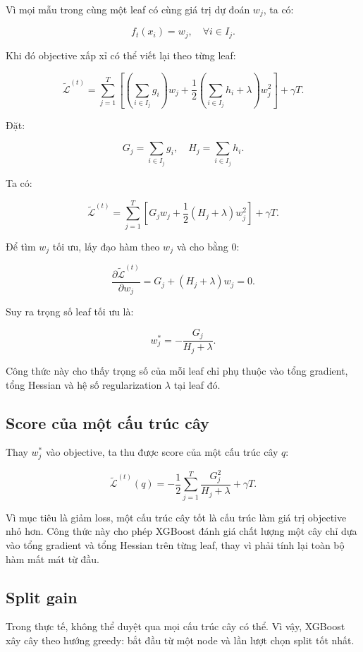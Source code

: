Vì mọi mẫu trong cùng một leaf có cùng giá trị dự đoán $w_j$, ta có:

\[
f_t(x_i) = w_j, \quad \forall i \in I_j.
\]

Khi đó objective xấp xỉ có thể viết lại theo từng leaf:

\[
\tilde{\mathcal{L}}^{(t)}
=
\sum_{j=1}^{T}
\left[
\left(\sum_{i \in I_j} g_i\right) w_j
+
\frac{1}{2}
\left(\sum_{i \in I_j} h_i + \lambda\right) w_j^2
\right]
+
\gamma T.
\]

Đặt:

\[
G_j = \sum_{i \in I_j} g_i,
\quad
H_j = \sum_{i \in I_j} h_i.
\]

Ta có:

\[
\tilde{\mathcal{L}}^{(t)}
=
\sum_{j=1}^{T}
\left[
G_j w_j
+
\frac{1}{2}(H_j + \lambda)w_j^2
\right]
+
\gamma T.
\]

Để tìm $w_j$ tối ưu, lấy đạo hàm theo $w_j$ và cho bằng 0:

\[
\frac{\partial \tilde{\mathcal{L}}^{(t)}}{\partial w_j}
=
G_j + (H_j + \lambda)w_j = 0.
\]

Suy ra trọng số leaf tối ưu là:

\[
w_j^*
=
-
\frac{G_j}{H_j + \lambda}.
\]

Công thức này cho thấy trọng số của mỗi leaf chỉ phụ thuộc vào tổng gradient, tổng Hessian và hệ số regularization $\lambda$ tại leaf đó.

\subsection{Score của một cấu trúc cây}

Thay $w_j^*$ vào objective, ta thu được score của một cấu trúc cây $q$:

\[
\tilde{\mathcal{L}}^{(t)}(q)
=
-
\frac{1}{2}
\sum_{j=1}^{T}
\frac{G_j^2}{H_j + \lambda}
+
\gamma T.
\]

Vì mục tiêu là giảm loss, một cấu trúc cây tốt là cấu trúc làm giá trị objective nhỏ hơn. Công thức này cho phép XGBoost đánh giá chất lượng một cây chỉ dựa vào tổng gradient và tổng Hessian trên từng leaf, thay vì phải tính lại toàn bộ hàm mất mát từ đầu.

\subsection{Split gain}

Trong thực tế, không thể duyệt qua mọi cấu trúc cây có thể. Vì vậy, XGBoost xây cây theo hướng greedy: bắt đầu từ một node và lần lượt chọn split tốt nhất.

